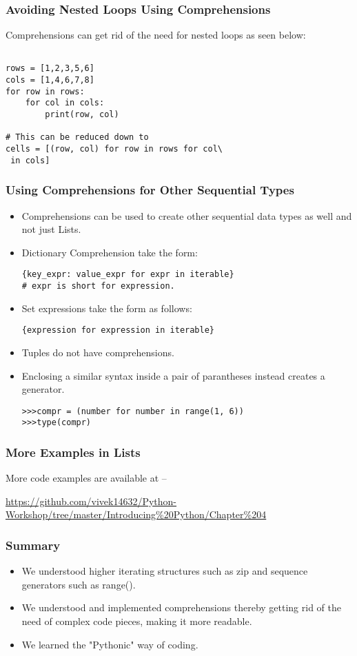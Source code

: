 \documentclass{beamer}
\begin{document}
\begin{frame}[fragile]
\frametitle{Avoiding Nested Loops Using Comprehensions}
Comprehensions can get rid of the need for nested loops as seen below:
\begin{lstlisting}

rows = [1,2,3,5,6]
cols = [1,4,6,7,8]
for row in rows:
    for col in cols:
        print(row, col)
        
# This can be reduced down to
cells = [(row, col) for row in rows for col\
 in cols]

\end{lstlisting}

\end{frame}

\begin{frame}[fragile]
\frametitle{Using Comprehensions for Other Sequential Types}
\begin{itemize}
\item Comprehensions can be used to create other sequential data types as well and not just Lists.
\item Dictionary Comprehension take the form:
\begin{lstlisting}
{key_expr: value_expr for expr in iterable}
# expr is short for expression.
\end{lstlisting}
\item Set expressions take the form as follows:
\begin{lstlisting}
{expression for expression in iterable}
\end{lstlisting}
\item Tuples do not have comprehensions. 
\item Enclosing a similar syntax inside a pair of parantheses instead creates a generator.
\begin{lstlisting}
>>>compr = (number for number in range(1, 6))
>>>type(compr)
\end{lstlisting}
\end{itemize}
\end{frame}

\begin{frame}
\frametitle{More Examples in Lists}
More code examples are available at --
 
\url{https://github.com/vivek14632/Python-Workshop/tree/master/Introducing\%20Python/Chapter\%204}
\end{frame}


\begin{frame}
\frametitle{Summary}
\begin{itemize}
\item We understood higher iterating structures such as zip and sequence generators such as range().
\item We understood and implemented comprehensions thereby getting rid of the need of complex code pieces, making it more readable.
\item We learned the "Pythonic" way of coding.
\end{itemize}
\end{frame}
\end{document}
